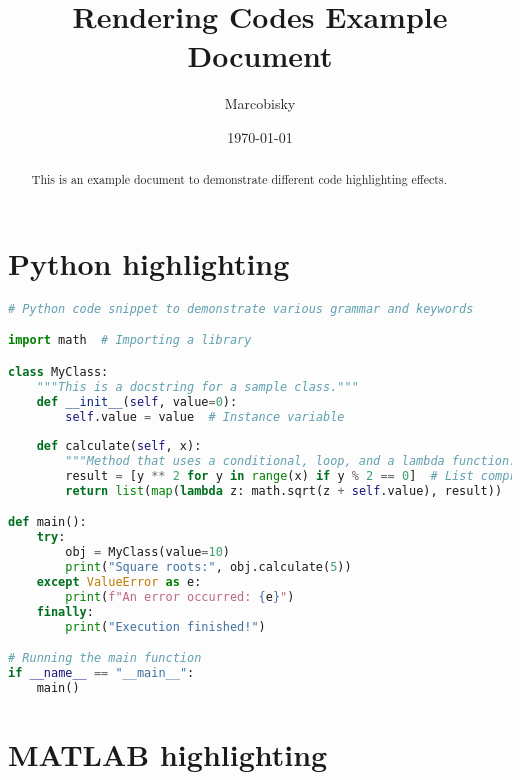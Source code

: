 \documentclass[12pt]{article}
\title{Rendering Codes Example Document}
\author{Marcobisky}
\date{\today}
\begin{document}
\maketitle
\begin{abstract}
    This is an example document to demonstrate different code highlighting effects.
\end{abstract}

\section{Python highlighting}

\begin{lstlisting}[caption={This is a literal python code}, label={lst:python1}, language=Python, style=custompython]
# Python code snippet to demonstrate various grammar and keywords

import math  # Importing a library

class MyClass:
    """This is a docstring for a sample class."""
    def __init__(self, value=0):
        self.value = value  # Instance variable
    
    def calculate(self, x):
        """Method that uses a conditional, loop, and a lambda function."""
        result = [y ** 2 for y in range(x) if y % 2 == 0]  # List comprehension
        return list(map(lambda z: math.sqrt(z + self.value), result))  # Lambda and map

def main():
    try:
        obj = MyClass(value=10)
        print("Square roots:", obj.calculate(5))
    except ValueError as e:
        print(f"An error occurred: {e}")
    finally:
        print("Execution finished!")

# Running the main function
if __name__ == "__main__":
    main()
\end{lstlisting}



\section{MATLAB highlighting}
\end{document}
